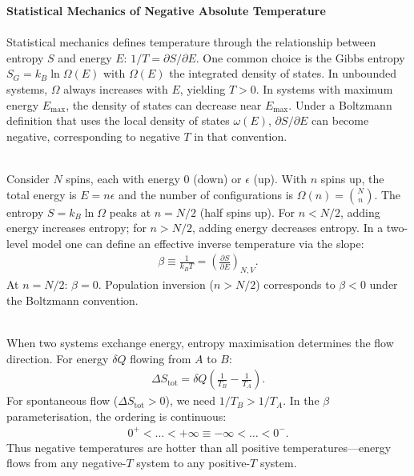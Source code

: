 \begin{technical}
{\Large\textbf{Statistical Mechanics of Negative Absolute Temperature}}\\[0.3em]

\\[0.5em]
Statistical mechanics defines temperature through the relationship between entropy $S$ and energy $E$: $1/T = \partial S/\partial E$. One common choice is the Gibbs entropy $S_G = k_B \ln \Omega(E)$ with $\Omega(E)$ the integrated density of states. In unbounded systems, $\Omega$ always increases with $E$, yielding $T > 0$. In systems with maximum energy $E_{\max}$, the density of states can decrease near $E_{\max}$. Under a Boltzmann definition that uses the local density of states $\omega(E)$, $\partial S/\partial E$ can become negative, corresponding to negative $T$ in that convention.

\\[0.5em]
Consider $N$ spins, each with energy 0 (down) or $\epsilon$ (up). With $n$ spins up, the total energy is $E = n\epsilon$ and the number of configurations is $\Omega(n) = \binom{N}{n}$. The entropy $S = k_B \ln \Omega$ peaks at $n = N/2$ (half spins up). For $n < N/2$, adding energy increases entropy; for $n > N/2$, adding energy decreases entropy. In a two-level model one can define an effective inverse temperature via the slope:
\begin{align*}
\beta \equiv \frac{1}{k_B T} = \left(\frac{\partial S}{\partial E}\right)_{N,V}.
\end{align*}
At $n = N/2$: $\beta = 0$. Population inversion ($n > N/2$) corresponds to $\beta < 0$ under the Boltzmann convention.

\\[0.5em]
When two systems exchange energy, entropy maximisation determines the flow direction. For energy $\delta Q$ flowing from $A$ to $B$:
\begin{align*}
\Delta S_{\text{tot}} = \delta Q \left( \frac{1}{T_B} - \frac{1}{T_A} \right).
\end{align*}
For spontaneous flow ($\Delta S_{\text{tot}} > 0$), we need $1/T_B > 1/T_A$. In the $\beta$ parameterisation, the ordering is continuous:
\begin{align*}
0^+ < \ldots < +\infty \equiv -\infty < \ldots < 0^-.
\end{align*}
Thus negative temperatures are \QSOpen{}hotter\QSClose{} than all positive temperatures—energy flows from any negative-$T$ system to any positive-$T$ system.


\end{technical}
